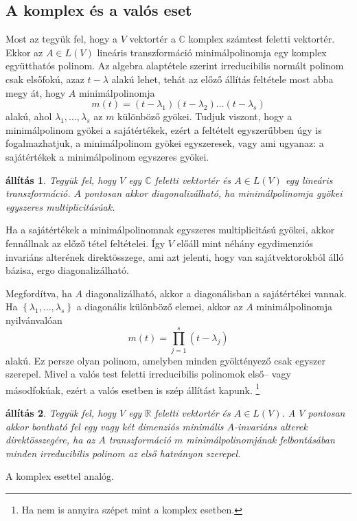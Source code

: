 \documentclass[9pt, a4paper, showtrims]{memoir}
\makeatletter
\renewenvironment{proof}[1][\proofname]
    {\par\pushQED{\qed}%
    \normalfont \topsep6\p@\@plus6\p@\relax
    \trivlist
    \item[\hskip\labelsep
        \itshape
    #1\@addpunct{:}]\ignorespaces}
    {\popQED\endtrivlist\@endpefalse}
\theoremstyle{plain}
\newtheorem{proposition}{állítás}[chapter]
\theoremstyle{remark}
\theoremstyle{definition}
\makeatother
\begin{document}
    \subsection{A komplex és a valós eset}
    Most az tegyük fel, hogy a $V$ vektortér a $\mathbb{C}$ komplex számtest feletti vektortér.
    Ekkor az $A\in L\left( V \right)$ lineáris transzformáció minimálpolinomja egy komplex együtthatós polinom.
    Az algebra alaptétele szerint irreducibilis normált polinom csak elsőfokú, azaz $t-\lambda$ alakú lehet,
    tehát az előző állítás feltétele most abba megy át, hogy $A$ minimálpolinomja
    \[
        m\left( t \right)=\left( t-\lambda_1 \right)\left( t-\lambda_2 \right)\dots\left( t-\lambda_s \right)
    \]
    alakú, ahol $\lambda_1,\dots,\lambda_s$ az $m$ különböző gyökei.
    Tudjuk viszont, hogy a minimálpolinom gyökei a sajátértékek,
    ezért a feltételt egyszerűbben úgy is fogalmazhatjuk,
    a minimálpolinom gyökei egyszeresek, vagy ami ugyanaz: 
    a sajátértékek a minimálpolinom egyszeres gyökei.
    \begin{proposition}\label{pr:redukcio-primfelbontas-2}
        Tegyük fel, hogy $V$ egy $\mathbb{C}$ feletti vektortér és $A\in L\left( V \right)$ egy lineáris transzformáció.
        $A$ pontosan akkor diagonalizálható,
        ha minimálpolinomja gyökei egyszeres multiplicitásúak.
    \end{proposition}
    \begin{proof}
        Ha a sajátértékek a minimálpolinomnak egyszeres multiplicitású gyökei,
        akkor fennállnak az előző tétel feltételei.
        Így $V$ előáll mint néhány egydimenziós invariáns alterének direktösszege,
        ami azt jelenti, hogy van sajátvektorokból álló bázisa, ergo diagonalizálható.

        Megfordítva, ha $A$ diagonalizálható, akkor a diagonálisban a sajátértékei vannak.
        Ha $\left\{ \lambda_1,\dots,\lambda_s \right\}$ a diagonális különböző elemei,
        akkor az $A$ minimálpolinomja nyilvánvalóan
        \[
            m\left( t \right)
            =
            \prod_{j=1}^s\left( t-\lambda_j \right)
        \]
        alakú.
        Ez persze olyan polinom, 
        amelyben minden gyöktényező csak egyszer szerepel.
    \end{proof}
    Mivel a valós test feletti irreducibilis polinomok első-- vagy másodfokúak, 
    ezért a valós esetben is szép állítást kapunk.
    \footnote{Ha nem is annyira szépet mint a komplex esetben.}
    \begin{proposition}
        Tegyük fel, hogy $V$ egy $\mathbb{R}$ feletti vektortér és $A\in L\left( V \right)$.
        A $V$ pontosan akkor bontható fel egy vagy két dimenziós minimális $A$-invariáns alterek direktösszegére,
        ha az $A$ transzformáció $m$ 
        minimálpolinomjának felbontásában minden irreducibilis polinom az első hatványon szerepel.
    \end{proposition}
    \begin{proof}
        A komplex esettel analóg.
    \end{proof}
\end{document}
